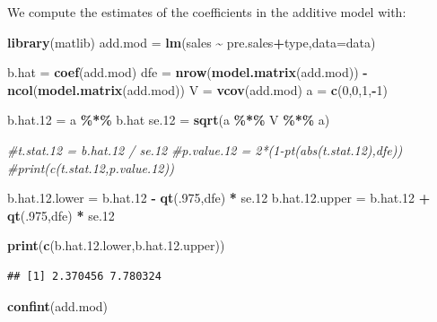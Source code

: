 \documentclass[
]{article}
\newenvironment{Shaded}{\begin{snugshade}}{\end{snugshade}}
\newcommand{\AttributeTok}[1]{\textcolor[rgb]{0.13,0.29,0.53}{#1}}
\newcommand{\CommentTok}[1]{\textcolor[rgb]{0.56,0.35,0.01}{\textit{#1}}}
\newcommand{\DecValTok}[1]{\textcolor[rgb]{0.00,0.00,0.81}{#1}}
\newcommand{\FloatTok}[1]{\textcolor[rgb]{0.00,0.00,0.81}{#1}}
\newcommand{\FunctionTok}[1]{\textcolor[rgb]{0.13,0.29,0.53}{\textbf{#1}}}
\newcommand{\NormalTok}[1]{#1}
\newcommand{\OtherTok}[1]{\textcolor[rgb]{0.56,0.35,0.01}{#1}}
\newcommand{\SpecialCharTok}[1]{\textcolor[rgb]{0.81,0.36,0.00}{\textbf{#1}}}
\begin{document}
We compute the estimates of the coefficients in the additive model with:

\begin{Shaded}
\begin{Highlighting}[]
\FunctionTok{library}\NormalTok{(matlib)}
\NormalTok{add.mod }\OtherTok{=} \FunctionTok{lm}\NormalTok{(sales }\SpecialCharTok{\textasciitilde{}}\NormalTok{ pre.sales}\SpecialCharTok{+}\NormalTok{type,}\AttributeTok{data=}\NormalTok{data)}

\NormalTok{b.hat }\OtherTok{=} \FunctionTok{coef}\NormalTok{(add.mod)}
\NormalTok{dfe }\OtherTok{=} \FunctionTok{nrow}\NormalTok{(}\FunctionTok{model.matrix}\NormalTok{(add.mod)) }\SpecialCharTok{{-}} \FunctionTok{ncol}\NormalTok{(}\FunctionTok{model.matrix}\NormalTok{(add.mod))}
\NormalTok{V }\OtherTok{=} \FunctionTok{vcov}\NormalTok{(add.mod)}
\NormalTok{a }\OtherTok{=} \FunctionTok{c}\NormalTok{(}\DecValTok{0}\NormalTok{,}\DecValTok{0}\NormalTok{,}\DecValTok{1}\NormalTok{,}\SpecialCharTok{{-}}\DecValTok{1}\NormalTok{)}

\NormalTok{b.hat}\FloatTok{.12} \OtherTok{=}\NormalTok{ a }\SpecialCharTok{\%*\%}\NormalTok{ b.hat}
\NormalTok{se}\FloatTok{.12} \OtherTok{=} \FunctionTok{sqrt}\NormalTok{(a }\SpecialCharTok{\%*\%}\NormalTok{ V }\SpecialCharTok{\%*\%}\NormalTok{ a)}

\CommentTok{\#t.stat.12 = b.hat.12 / se.12}
\CommentTok{\#p.value.12 = 2*(1{-}pt(abs(t.stat.12),dfe))}
\CommentTok{\#print(c(t.stat.12,p.value.12))}

\NormalTok{b.hat.}\FloatTok{12.}\NormalTok{lower }\OtherTok{=}\NormalTok{ b.hat}\FloatTok{.12} \SpecialCharTok{{-}} \FunctionTok{qt}\NormalTok{(.}\DecValTok{975}\NormalTok{,dfe) }\SpecialCharTok{*}\NormalTok{ se}\FloatTok{.12}
\NormalTok{b.hat.}\FloatTok{12.}\NormalTok{upper }\OtherTok{=}\NormalTok{ b.hat}\FloatTok{.12} \SpecialCharTok{+} \FunctionTok{qt}\NormalTok{(.}\DecValTok{975}\NormalTok{,dfe) }\SpecialCharTok{*}\NormalTok{ se}\FloatTok{.12}

\FunctionTok{print}\NormalTok{(}\FunctionTok{c}\NormalTok{(b.hat.}\FloatTok{12.}\NormalTok{lower,b.hat.}\FloatTok{12.}\NormalTok{upper))}
\end{Highlighting}
\end{Shaded}

\begin{verbatim}
## [1] 2.370456 7.780324
\end{verbatim}

\begin{Shaded}
\begin{Highlighting}[]
\FunctionTok{confint}\NormalTok{(add.mod)}
\end{Highlighting}
\end{Shaded}
\end{document}
